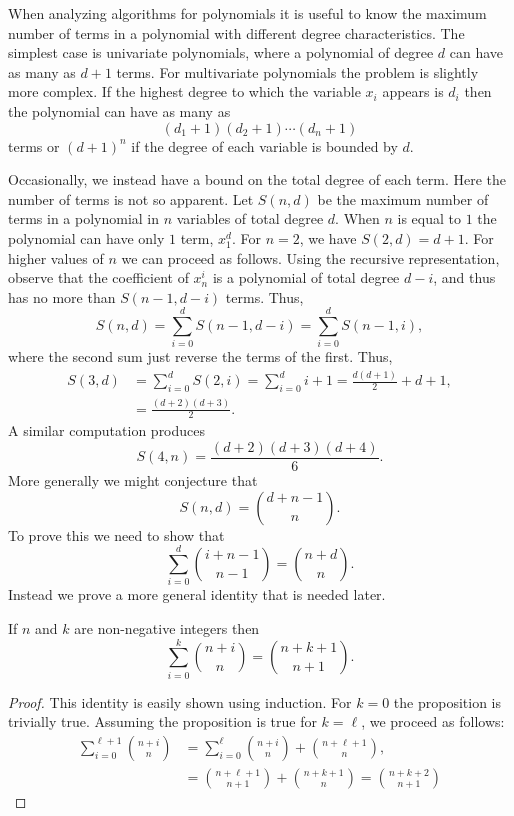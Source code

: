 When analyzing algorithms for polynomials it is useful to know the
maximum number of terms in a polynomial with different degree
characteristics.  The simplest case is univariate polynomials, where a
polynomial of degree $d$ can have as many as $d+1$ terms.  For
multivariate polynomials the problem is slightly more complex.  If the
highest degree to which the variable $x_i$ appears is $d_i$ then the
polynomial can have as many as
\[
(d_1 + 1) (d_2 + 1) \cdots (d_n + 1)
\]
terms or $(d+1)^n$ if the degree of each variable is bounded by $d$.

Occasionally, we instead have a bound on the total degree of each
term.  Here the number of terms is not so apparent.  Let $S(n, d)$ be
the maximum number of terms in a polynomial in $n$ variables of total
degree $d$.  When $n$ is equal to $1$ the polynomial can have only
$1$ term, $x_1^d$.  For $n=2$, we have $S(2, d)= d+1$.  For higher
values of $n$ we can proceed as follows.  Using the recursive
representation, observe that the coefficient of $x_n^i$ is a
polynomial of total degree $d-i$, and thus has no more than $S(n-1,
d-i)$ terms.  Thus,
\[
S(n, d) = \sum_{i=0}^d S(n-1, d-i) = \sum_{i=0}^d S(n-1, i),
\]
where the second sum just reverse the terms of the first.  Thus,
\[
\begin{aligned}
S(3, d) & \displaystyle = \sum_{i=0}^d S(2, i) = \sum_{i=0}^d i+1 = \frac{d(d+1)}{2} +
d + 1, \\
 &\displaystyle = \frac{(d+2)(d+3)}{2}.
\end{aligned}
\]
A similar computation produces
\[
S(4, n) = \frac{(d+2) (d+3) (d+4)}{6}.
\]
More generally we might conjecture that
\[
S(n, d) = {d + n - 1 \choose n}.
\]
To prove this we need to show that 
\[
\sum_{i=0}^d {i + n - 1 \choose n - 1} = {n + d \choose n}.
\]
Instead we prove a more general identity that is needed later.

\begin{proposition}\label{CombinSum:Prop}
If $n$ and $k$ are non-negative integers then 
\[
\sum_{i=0}^k { n + i \choose n} = {n + k + 1 \choose n + 1}.
\]
\end{proposition}

\begin{proof}
This identity is easily shown using induction.  For $k = 0$ the
proposition is trivially true.  Assuming the proposition is true for
$k = \ell$, we proceed as follows:
\[
\begin{aligned}
\displaystyle \sum_{i=0}^{\ell+1} { n + i \choose n} & = 
\displaystyle \sum_{i=0}^{\ell} { n + i \choose n} + {n + \ell +1
\choose n}, \\
 & \displaystyle = {n + \ell +1 \choose n + 1} + {n + k + 1\choose n}
= {n + k + 2 \choose n + 1}
\end{aligned}
\]
\end{proof}

